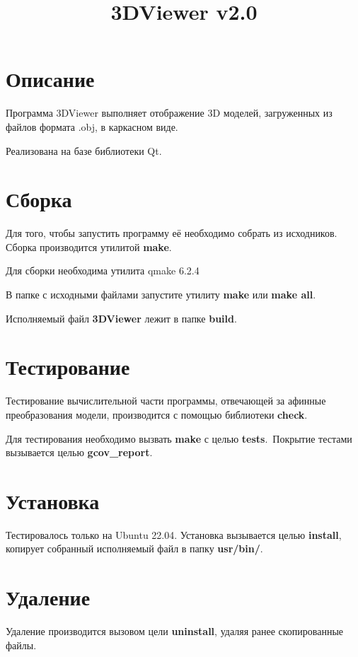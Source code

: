 \documentclass[12pt, a4paper]{article}
\title{3DViewer v2.0}
\date{}
\begin{document}
\maketitle
\tableofcontents

\pagebreak

\section*{Описание}

Программа 3DViewer выполняет отображение 3D моделей, загруженных из файлов формата .obj, в каркасном виде.

Реализована на базе библиотеки Qt.

\section{Сборка}

Для того, чтобы запустить программу её необходимо собрать из исходников.
Сборка производится утилитой \textbf{make}.

Для сборки необходима утилита qmake 6.2.4

В папке с исходными файлами запустите утилиту \textbf{make} или \textbf{make all}.

Исполняемый файл \textbf{3DViewer} лежит в папке \textbf{build}.

\section{Тестирование}
Тестирование вычислительной части программы, отвечающей за афинные преобразования модели, производится с помощью библиотеки \textbf{check}.

Для тестирования необходимо вызвать \textbf{make} с целью \textbf{tests}.\
Покрытие тестами вызывается целью \textbf{gcov\_report}.

\section{Установка}
Тестировалось только на Ubuntu 22.04.
Установка вызывается целью \textbf{install}, копирует собранный исполняемый файл в папку \textbf{usr/bin/}. 

\section{Удаление}
Удаление производится вызовом цели \textbf{uninstall}, удаляя ранее скопированные файлы.
\vfill
\end{document}
